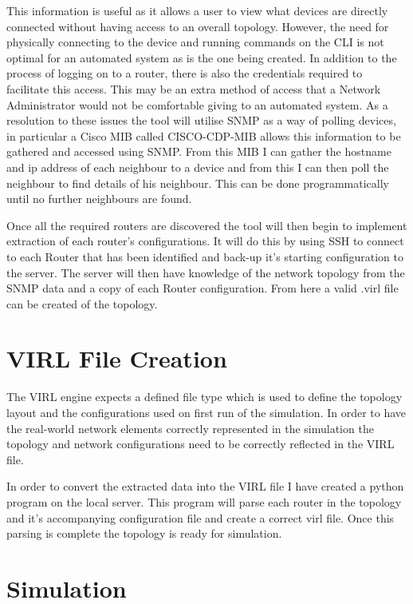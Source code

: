\documentclass[11pt]{report}
\begin{document}
This information is useful as it allows a user to view what devices are directly connected without having access to an overall topology. However, the need for physically connecting to the device and running commands on the CLI is  not optimal for an automated system as is the one being created. In addition to the process of logging on to a router, there is also the credentials required to facilitate this access. This may be an extra method of access that a Network Administrator would not be comfortable giving to an automated system. As a resolution to these issues the tool will utilise SNMP as a way of polling devices, in particular a Cisco MIB called CISCO-CDP-MIB allows this information to be gathered and accessed using SNMP. From this MIB I can gather the hostname and ip address of each neighbour to a device and from this I can then poll the neighbour to find details of his neighbour. This can be done programmatically until no further neighbours are found.

Once all the required routers are discovered the tool will then begin to implement extraction of each router's configurations. It will do this by using SSH to connect to each Router that has been identified and back-up it's starting configuration to the server. The server will then have knowledge of the network topology from the SNMP data and a copy of each Router configuration. From here a valid .virl file can be created of the topology. 

\section{VIRL File Creation}

The VIRL engine expects a defined file type which is used to define the topology layout and the configurations used on first run of the simulation. In order to have the real-world network elements correctly represented in the simulation the topology and network configurations need to be correctly reflected in the VIRL file. 

In order to convert the extracted data into the VIRL file I have created a python program on the local server. This program will parse each router in the topology and it's accompanying configuration file and create a correct virl file. Once this parsing is complete the topology is ready for simulation.

\section{Simulation}
\end{document}
